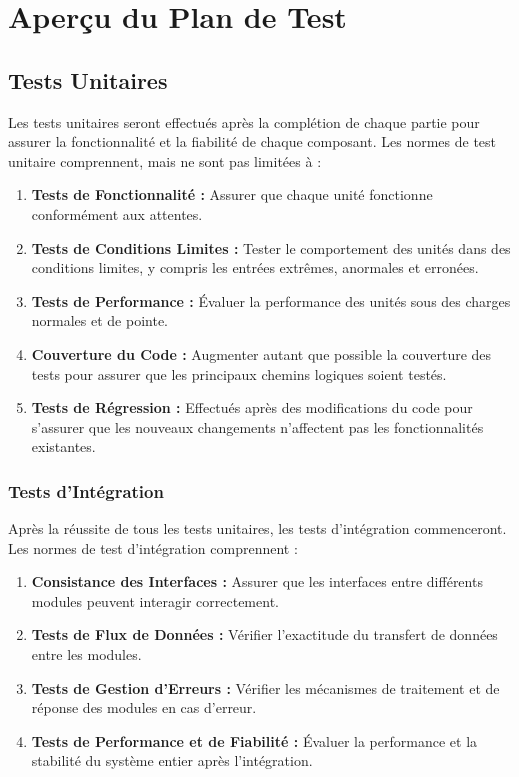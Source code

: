 \documentclass{article}
\begin{document}
\section{Aperçu du Plan de Test}
\subsection{Tests Unitaires}
Les tests unitaires seront effectués après la complétion de chaque partie pour assurer la fonctionnalité et la fiabilité de chaque composant. Les normes de test unitaire comprennent, mais ne sont pas limitées à :
\begin{enumerate}
    \item \textbf{Tests de Fonctionnalité :} Assurer que chaque unité fonctionne conformément aux attentes.
    \item \textbf{Tests de Conditions Limites : }Tester le comportement des unités dans des conditions limites, y compris les entrées extrêmes, anormales et erronées.
    \item \textbf{Tests de Performance : }Évaluer la performance des unités sous des charges normales et de pointe.
    \item \textbf{Couverture du Code :} Augmenter autant que possible la couverture des tests pour assurer que les principaux chemins logiques soient testés.
    \item \textbf{Tests de Régression :} Effectués après des modifications du code pour s'assurer que les nouveaux changements n'affectent pas les fonctionnalités existantes.
\end{enumerate}
\subsubsection{Tests d'Intégration}
Après la réussite de tous les tests unitaires, les tests d'intégration commenceront. Les normes de test d'intégration comprennent :
\begin{enumerate}
    \item \textbf{Consistance des Interfaces :} Assurer que les interfaces entre différents modules peuvent interagir correctement.
    \item \textbf{Tests de Flux de Données :} Vérifier l'exactitude du transfert de données entre les modules.
    \item \textbf{Tests de Gestion d'Erreurs : }Vérifier les mécanismes de traitement et de réponse des modules en cas d'erreur.
    \item \textbf{Tests de Performance et de Fiabilité :} Évaluer la performance et la stabilité du système entier après l'intégration.
\end{enumerate}
\end{document}
